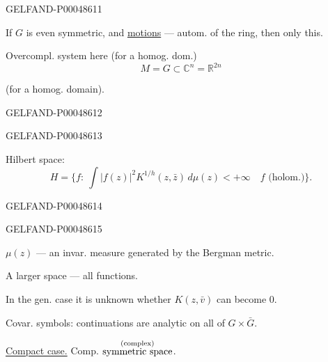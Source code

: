 \begin{GelfandAdjacentEvidence}{GELFAND-P000486}{11}


If $G$ is even symmetric, and \uline{motions} — autom. of the ring,
then only this.

Overcompl. system here (for a homog. dom.)
\[
M=G\subset\mathbb C^n=\mathbb R^{2n}
\]
\begin{center}
\begingroup\color{black}\endgroup
\qquad(for a homog. domain).
\end{center}
\end{GelfandAdjacentEvidence}
\begin{GelfandAdjacentEvidence}{GELFAND-P000486}{12}

\end{GelfandAdjacentEvidence}
\begin{GelfandAdjacentEvidence}{GELFAND-P000486}{13}


Hilbert space:
\[
H=\{f:\ \int |f(z)|^2K^{1/h}(z,\bar z)\,d\mu(z)<+\infty
\quad f\text{ (holom.)}\}.
\]
\end{GelfandAdjacentEvidence}
\begin{GelfandAdjacentEvidence}{GELFAND-P000486}{14}

\end{GelfandAdjacentEvidence}
\begin{GelfandAdjacentEvidence}{GELFAND-P000486}{15}


$\mu(z)$ — an invar. measure generated by the Bergman metric.

A larger space — all functions.

In the gen. case it is unknown whether $K(z,\bar v)$ can become $0$.

Covar. symbols: continuations are analytic on all of $G\times\bar G$.

\uline{Compact case.}
Comp.
$\overset{\text{\scriptsize (complex)}}{\text{symmetric space}}$.
\end{GelfandAdjacentEvidence}


